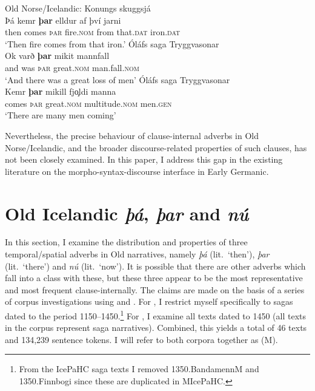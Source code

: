 \documentclass[output=paper,colorlinks,citecolor=brown]{langscibook}
\begin{document}
\ea \label{faarlund} Old Norse/Icelandic:
\ea Konungs skuggsjá\\
\gll Þá kemr \textbf{þar} elldur af því jarni\\
then comes \textsc{þar} fire.\textsc{nom} from that.\textsc{dat} iron.\textsc{dat}\\
\glt `Then fire comes from that iron.' 
\ex Óláfs saga Tryggvasonar\\
\gll Ok varð \textbf{þar} mikit mannfall\\
and was \textsc{þar} great.\textsc{nom} man.fall.\textsc{nom}\\
\glt `And there was a great loss of men' 
\ex Óláfs saga Tryggvasonar\\
\gll Kemr \textbf{þar} mikill fj\c{o}ldi manna\\
comes \textsc{þar} great.\textsc{nom} multitude.\textsc{nom} men.\textsc{gen}\\
\glt `There are many men coming' \hfill \citep[71]{Faarlund1990}
\z 
\z 

Nevertheless, the precise behaviour of clause-internal adverbs in Old Norse/Ice\-landic, and the broader discourse-related properties of such clauses, has not been closely examined. In this paper, I address this gap in the existing literature on the morpho-syntax-discourse interface in Early Germanic.


\section{Old Icelandic \textit{þá}, \textit{þar} and \textit{nú}}\label{sect:data}

In this section, I examine the distribution and properties of three temporal/spatial adverbs in Old  narratives, namely \textit{þá} (lit.~`then'), \textit{þar} (lit.~`there') and \textit{nú} (lit.~`now'). It is possible that there are other adverbs which fall into a class with these, but these three appear to be the most representative and most frequent clause-internally. The claims are made on the basis of a series of corpus investigations using  \citep{IcePaHC} and  \citep{MIcePaHC}. For , I restrict myself specifically to sagas dated to the period 1150--1450.\footnote{From the IcePaHC saga texts I removed 1350.BandamennM and 1350.Finnbogi since these are duplicated in MIcePaHC.} For , I examine all texts dated to 1450 (all texts in the corpus represent saga narratives). Combined, this yields a total of 46 texts and 134,239 sentence tokens. I will refer to both corpora together as (M).
\end{document}
